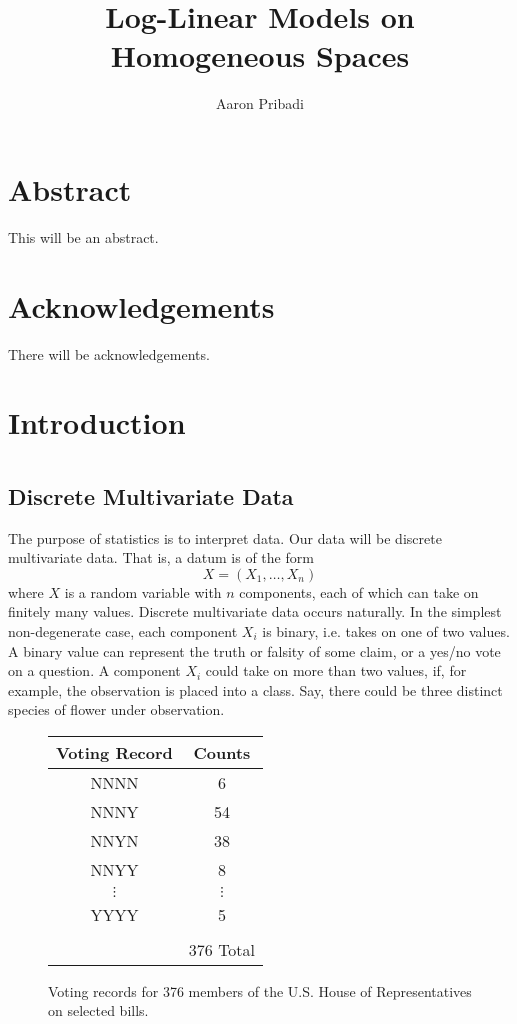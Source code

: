 \documentclass[cclicense]{hmcthesis}
\title{Log-Linear Models on Homogeneous Spaces}
\author{Aaron Pribadi}
\numberwithin{equation}{chapter}
\numberwithin{thmcounter}{chapter}
\begin{document}
\frontmatter

\maketitle

\tableofcontents


\chapter{Abstract}
    This will be an abstract.

\chapter{Acknowledgements}
    There will be acknowledgements.

\mainmatter

\chapter{Introduction}



\chapter{}

    \section{Discrete Multivariate Data}
    The purpose of statistics is to interpret data.  Our data will be discrete
    multivariate data.  That is, a datum is of the form
    \[
        X = (X_1, \ldots, X_n)
    \]
    where $X$ is a random variable with $n$ components, each of which can take
    on finitely many values.  Discrete multivariate data occurs naturally.  In
    the simplest non-degenerate case, each component $X_i$ is binary, i.e. takes
    on one of two values.  A binary value can represent the truth or falsity of
    some claim, or a yes/no vote on a question.  A component $X_i$ could take on
    more than two values, if, for example, the observation is placed into a
    class.  Say, there could be three distinct species of flower under
    observation.

    \begin{figure}[H]
    \centering
    \begin{tabular}{c c}
        Voting Record & Counts \\
        \hline
        {NNNN} & 6 \\
        {NNNY} & 54 \\
        {NNYN} & 38 \\
        {NNYY} & 8 \\
        $\vdots$ & $\vdots$ \\
        {YYYY} & 5
        \\
        \\
        & 376 Total
    \end{tabular}
    \caption{Voting records for 376 members of the U.S. House of Representatives
    on selected bills.}
    \end{figure}
\end{document}
